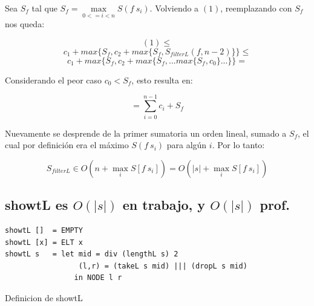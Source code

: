 \documentclass[12pt]{article}
\begin{document}
\begin{itemize}
    Sea $S_f$ tal que $S_f = \max\limits_{0<=i<n} S(f\ s_i)$. 
    Volviendo a $(1)$, reemplazando con $S_f$ nos queda:

    $$ (1) \leq $$
    $$ c_1 + max\{ S_f, c_2 + max\{S_f, S_{filterL}(f, n-2) \} \} \leq $$
    $$ c_1 + max\{ S_f, c_2 + max\{S_f, ... max\{ S_f, c_0 \} ... \} \} = $$

    Considerando el peor caso $c_0 < S_f$, esto resulta en:

    $$ = \sum\limits_{i=0}^{n-1} c_i + S_f $$

    Nuevamente se desprende de la primer sumatoria un orden lineal, sumado a $S_f$, el cual por definición era el máximo $S(f\ s_i)$ para algún $i$. Por lo tanto:

    $$ S_{filterL} \in O(n + \max\limits_{i} S[f\ s_i] ) = O(|s| + \max\limits_{i} S[f\ s_i] ) $$
    
\end{itemize}


\subsection{showtL es $O(|s|)$ en trabajo, y $O(|s|)$ prof.}

\begin{table}[h]
\begin{lstlisting}
showtL []  = EMPTY
showtL [x] = ELT x
showtL s   = let mid = div (lengthL s) 2
                 (l,r) = (takeL s mid) ||| (dropL s mid)
                in NODE l r
\end{lstlisting}
\caption{Definicion de showtL}
\end{table}
\end{document}
